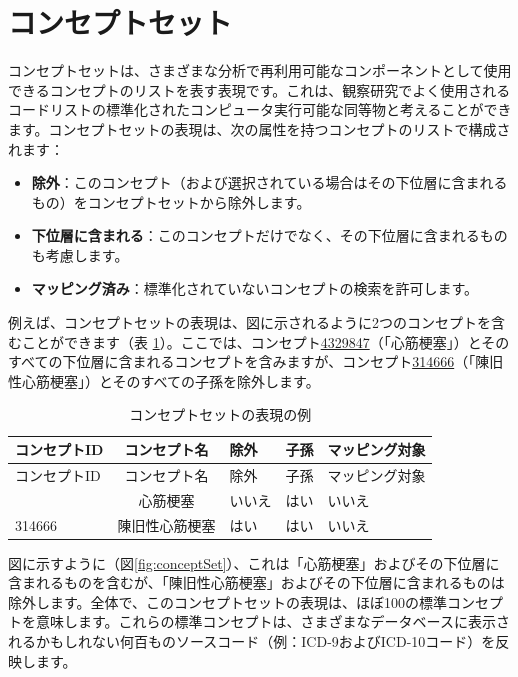 \documentclass[
  11pt]{book}
\providecommand{\tightlist}{%
  \setlength{\itemsep}{0pt}\setlength{\parskip}{0pt}}
\theoremstyle{definition}
\theoremstyle{definition}
\theoremstyle{definition}
\theoremstyle{definition}
\theoremstyle{remark}
\begin{document}
\section{コンセプトセット}\label{conceptSets}


コンセプトセットは、さまざまな分析で再利用可能なコンポーネントとして使用できるコンセプトのリストを表す表現です。これは、観察研究でよく使用されるコードリストの標準化されたコンピュータ実行可能な同等物と考えることができます。コンセプトセットの表現は、次の属性を持つコンセプトのリストで構成されます：

\begin{itemize}
\tightlist
\item
  \textbf{除外}：このコンセプト（および選択されている場合はその下位層に含まれるもの）をコンセプトセットから除外します。
\item
  \textbf{下位層に含まれる}：このコンセプトだけでなく、その下位層に含まれるものも考慮します。
\item
  \textbf{マッピング済み}：標準化されていないコンセプトの検索を許可します。
\end{itemize}

例えば、コンセプトセットの表現は、図に示されるように2つのコンセプトを含むことができます（表 \ref{tab:conceptSetExpression}）。ここでは、コンセプト\href{http://athena.ohdsi.org/search-terms/terms/4329847}{4329847}（「心筋梗塞」）とそのすべての下位層に含まれるコンセプトを含みますが、コンセプト\href{http://athena.ohdsi.org/search-terms/terms/314666}{314666}（「陳旧性心筋梗塞」）とそのすべての子孫を除外します。

\begin{longtable}[]{@{}lclll@{}}
\caption{\label{tab:conceptSetExpression} コンセプトセットの表現の例}\tabularnewline
\toprule\noalign{}
コンセプトID & コンセプト名 & 除外 & 子孫 & マッピング対象 \\
\midrule\noalign{}
\endfirsthead
\toprule\noalign{}
コンセプトID & コンセプト名 & 除外 & 子孫 & マッピング対象 \\
\midrule\noalign{}
\endhead
\bottomrule\noalign{}
\endlastfoot
4329847 & 心筋梗塞 & いいえ & はい & いいえ \\
314666 & 陳旧性心筋梗塞 & はい & はい & いいえ \\
\end{longtable}

図に示すように（図\ref{fig:conceptSet}）、これは「心筋梗塞」およびその下位層に含まれるものを含むが、「陳旧性心筋梗塞」およびその下位層に含まれるものは除外します。全体で、このコンセプトセットの表現は、ほぼ100の標準コンセプトを意味します。これらの標準コンセプトは、さまざまなデータベースに表示されるかもしれない何百ものソースコード（例：ICD-9およびICD-10コード）を反映します。
\end{document}
